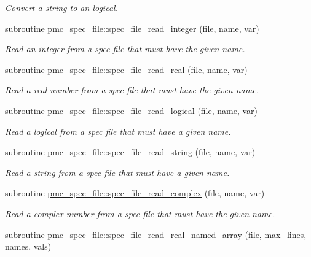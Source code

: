 \begin{DoxyCompactItemize}
\begin{DoxyCompactList}\small\item\em Convert a string to an logical. \end{DoxyCompactList}\item 
subroutine \mbox{\hyperlink{namespacepmc__spec__file_abee8b3b0c53f2d8484854da58d49901e}{pmc\+\_\+spec\+\_\+file\+::spec\+\_\+file\+\_\+read\+\_\+integer}} (file, name, var)
\begin{DoxyCompactList}\small\item\em Read an integer from a spec file that must have the given name. \end{DoxyCompactList}\item 
subroutine \mbox{\hyperlink{namespacepmc__spec__file_a2e83c0bd910f7d477fd5b5b7f6bb056b}{pmc\+\_\+spec\+\_\+file\+::spec\+\_\+file\+\_\+read\+\_\+real}} (file, name, var)
\begin{DoxyCompactList}\small\item\em Read a real number from a spec file that must have the given name. \end{DoxyCompactList}\item 
subroutine \mbox{\hyperlink{namespacepmc__spec__file_a4ad9aabbf3f21185cd6a140d2a237930}{pmc\+\_\+spec\+\_\+file\+::spec\+\_\+file\+\_\+read\+\_\+logical}} (file, name, var)
\begin{DoxyCompactList}\small\item\em Read a logical from a spec file that must have a given name. \end{DoxyCompactList}\item 
subroutine \mbox{\hyperlink{namespacepmc__spec__file_aac30a013e7ca64803b5190439f924626}{pmc\+\_\+spec\+\_\+file\+::spec\+\_\+file\+\_\+read\+\_\+string}} (file, name, var)
\begin{DoxyCompactList}\small\item\em Read a string from a spec file that must have a given name. \end{DoxyCompactList}\item 
subroutine \mbox{\hyperlink{namespacepmc__spec__file_a94e4dc72801e7c59f87a9df27ac7e417}{pmc\+\_\+spec\+\_\+file\+::spec\+\_\+file\+\_\+read\+\_\+complex}} (file, name, var)
\begin{DoxyCompactList}\small\item\em Read a complex number from a spec file that must have the given name. \end{DoxyCompactList}\item 
subroutine \mbox{\hyperlink{namespacepmc__spec__file_aaa4270afb530ff92767b3892d3a6e553}{pmc\+\_\+spec\+\_\+file\+::spec\+\_\+file\+\_\+read\+\_\+real\+\_\+named\+\_\+array}} (file, max\+\_\+lines, names, vals)

\end{DoxyCompactItemize}
